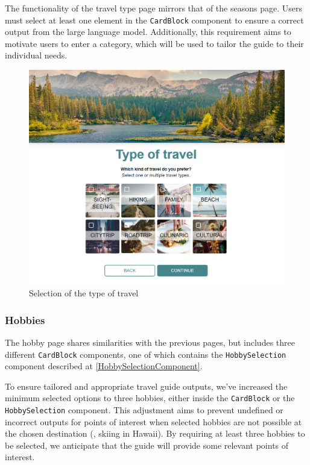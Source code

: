 \documentclass[english,notitlepage,smartquotes]{hgbreport}
\begin{document}
The functionality of the travel type page mirrors that of the seasons page. Users must select at least one element in the \texttt{CardBlock} component to ensure a correct output from the large language model. Additionally, this requirement aims to motivate users to enter a category, which will be used to tailor the guide to their individual needs.

\begin{figure}
	\centering
	\includegraphics[width=1\textwidth]{TravelType.png}
	\caption{Selection of the type of travel}
\end{figure}


\subsubsection{Hobbies}
The hobby page shares similarities with the previous pages, but includes three different \texttt{CardBlock} components, one of which contains the \texttt{HobbySelection} component described at \ref{HobbySelectionComponent}. 

To ensure tailored and appropriate travel guide outputs, we've increased the minimum selected options to three hobbies, either inside the \texttt{CardBlock} or the \texttt{HobbySelection} component. This adjustment aims to prevent undefined or incorrect outputs for points of interest when selected hobbies are not possible at the chosen destination (\eg, skiing in Hawaii). By requiring at least three hobbies to be selected, we anticipate that the guide will provide some relevant points of interest.
\end{document}
